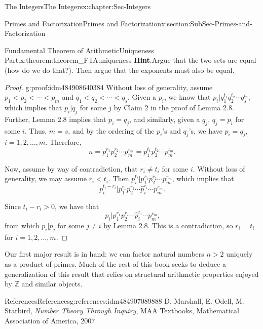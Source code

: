 \documentclass[oneside,10pt,]{book}
\newcommand{\blocktitlefont}{\relax}
\numberwithin{equation}{section}
\def\Z{{\mathbb Z}}
\newcommand{\lt}{<}
\begin{document}
\begin{chapterptx}{The Integers}{}{The Integers}{}{}{x:chapter:Sec-Integers}
\begin{sectionptx}{Primes and Factorization}{}{Primes and Factorization}{}{}{x:section:SubSec-Primes-and-Factorization}
\begin{theorem}{Fundamental Theorem of Arithmetic\textendash{}Uniqueness Part.}{}{x:theorem:theorem_FTAuniqueness}
\textbf{\blocktitlefont Hint}.\quad{}Argue that the two sets are equal (how do we do that?). Then argue that the exponents must also be equal.%
\end{theorem}
\begin{proof}{}{g:proof:idm484908640384}
Without loss of generality, assume \(p_1 \lt  p_2 \lt  \cdots \lt  p_m\) and \(q_1 \lt  q_2 \lt  \cdots \lt  q_s\). Given a \(p_i\), we know that \(p_i | q_1^{t_1} q_2^{t_2} \cdots q_s^{t_s}\), which implies that \(p_i | q_j\) for some \(j\) by Claim 2 in the proof of Lemma 2.8. Further, Lemma 2.8 implies that \(p_i = q_j\), and similarly, given a \(q_j\), \(q_j = p_i\) for some \(i\). Thus, \(m =s\), and by the ordering of the \(p_i\)'s and \(q_j\)'s, we have \(p_i = q_j\), \(i = 1, 2, \ldots, m\). Therefore,%
\begin{equation*}
n = p_1^{r_1} p_2^{r_2} \cdots p_m^{r_m} = p_1^{t_1} p_2^{t_2} \cdots p_m^{t_m}\text{.}
\end{equation*}
%
\par
Now, assume by way of contradiction, that \(r_i \ne t_i\) for some \(i\). Without loss of generality, we may assume \(r_i \lt  t_i\). Then \(p_i^{t_i} | p_1^{r_1} p_2^{r_2} \cdots p_m^{r_m}\), which implies that%
\begin{equation*}
p_i^{t_i - r_i} | p_1^{r_1} p_2^{r_2} \cdots \hat{p}_i^{r_i} \cdots p_m^{r_m}\text{.}
\end{equation*}
%
\par
Since \(t_i - r_i > 0\), we have that%
\begin{equation*}
p_i  | p_1^{r_1} p_2^{r_2} \cdots \hat{p}_i^{r_i} \cdots p_m^{r_m}\text{,}
\end{equation*}
from which \(p_i | p_j\) for some \(j\ne i\) by Lemma 2.8. This is a contradiction, so \(r_i = t_i\) for \(i = 1, 2, \ldots, m\).%
\end{proof}
Our first major result is in hand: we can factor natural numbers \(n > 2\) uniquely as a product of primes. Much of the rest of this book seeks to deduce a generalization of this result that relies on structural arithmetic properties enjoyed by \(\Z\) and similar objects.%
%
%
\typeout{************************************************}
\typeout{************************************************}
%
\begin{references-subsection-numberless}{References}{}{References}{}{}{g:references:idm484907089888}
D. Marshall, E. Odell, M. Starbird, \emph{Number Theory Through Inquiry}, MAA Textbooks, Mathematical Association of America, 2007\end{references-subsection-numberless}

\end{sectionptx}
\end{chapterptx}
\end{document}
